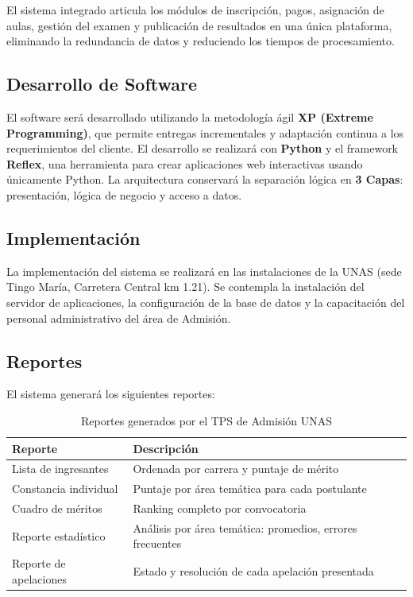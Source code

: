 \documentclass[12pt, a4paper]{report}
\begin{document}
El sistema integrado articula los módulos de inscripción, pagos, asignación de aulas, gestión del examen y publicación de resultados en una única plataforma, eliminando la redundancia de datos y reduciendo los tiempos de procesamiento.

\subsection{Desarrollo de Software}

El software será desarrollado utilizando la metodología ágil \textbf{XP (Extreme Programming)}, que permite entregas incrementales y adaptación continua a los requerimientos del cliente. El desarrollo se realizará con \textbf{Python} y el framework \textbf{Reflex}, una herramienta para crear aplicaciones web interactivas usando únicamente Python. La arquitectura conservará la separación lógica en \textbf{3 Capas}: presentación, lógica de negocio y acceso a datos.

\subsection{Implementación}

La implementación del sistema se realizará en las instalaciones de la UNAS (sede Tingo María, Carretera Central km 1.21). Se contempla la instalación del servidor de aplicaciones, la configuración de la base de datos y la capacitación del personal administrativo del área de Admisión.

\subsection{Reportes}

El sistema generará los siguientes reportes:

\begin{table}[H]
  \centering
  \caption{Reportes generados por el TPS de Admisión UNAS}
  \label{tab:reportes}
  \begin{tabular}{p{5cm} p{7cm}}
    \toprule
    \textbf{Reporte} & \textbf{Descripción} \\
    \midrule
    Lista de ingresantes & Ordenada por carrera y puntaje de mérito \\
    Constancia individual & Puntaje por área temática para cada postulante \\
    Cuadro de méritos & Ranking completo por convocatoria \\
    Reporte estadístico & Análisis por área temática: promedios, errores frecuentes \\
    Reporte de apelaciones & Estado y resolución de cada apelación presentada \\
    \bottomrule
  \end{tabular}
\end{table}
\end{document}
